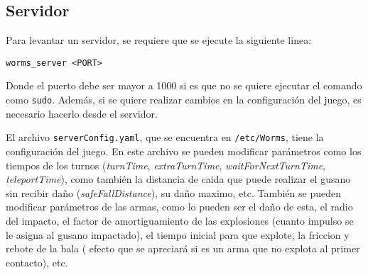 \subsection{Servidor}

Para levantar un servidor, se requiere que se ejecute la siguiente linea:

\begin{lstlisting}[frame=single, caption=Instalación de dependencias, label=code:openServer]
	worms_server <PORT>
\end{lstlisting}

Donde el puerto debe ser mayor a 1000 si es que no se quiere ejecutar el comando como \texttt{sudo}. Además, si se quiere realizar cambios en la configuración del juego, es necesario hacerlo desde el servidor. 

El archivo \texttt{serverConfig.yaml}, que se encuentra en \texttt{/etc/Worms}, tiene la configuración del juego. En este archivo se pueden modificar parámetros como los tiempos de los turnos (\emph{turnTime}, \emph{extraTurnTime}, \emph{waitForNextTurnTime}, \emph{teleportTime}), como también la distancia de caida que puede realizar el gusano sin recibir daño (\emph{safeFallDistance}), su daño maximo, etc. También se pueden modificar parámetros de las armas, como lo pueden ser el daño de esta, el radio del impacto, el factor de amortiguamiento de las explosiones (cuanto impulso se le asigna al gusano impactado), el tiempo inicial para que explote, la friccion y rebote de la bala ( efecto que se apreciará si es un arma que no explota al primer contacto), etc.
